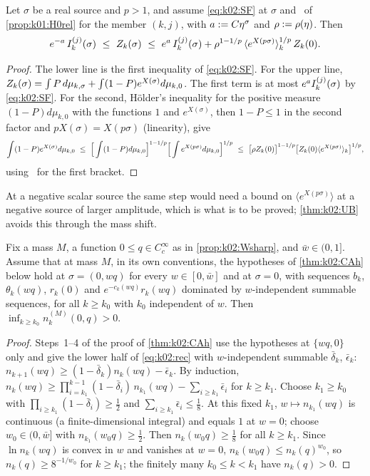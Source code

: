 \begin{lemma}\label{lem:k02:HLF}
Let $\sigma$ be a real source and $p>1$, and assume \eqref{eq:k02:SF} at $\sigma$ and \Rzero\ of \cref{prop:k01:H0rel} for the member $(k,j)$, with $a:= C\eta^\sigma$ and $\rho:=\rho(\eta)$. Then
\[
e^{-a}\,\Ik{j}(\sigma)\ \le\ \Zk(\sigma)\ \le\ e^{a}\,\Ik{j}(\sigma)+\rho^{1-1/p}\,\langle e^{X(p\sigma)}\rangle_k^{1/p}\,\Zk(0).
\]
\end{lemma}
\begin{proof}
The lower line is the first inequality of \eqref{eq:k02:SF}. For the upper line, $Z_{k}(\sigma)=\int P\,d\mu_{k,\sigma}+\int(1-P)e^{X(\sigma)}d\mu_{k,0}$. The first term is at most $e^{a}I^{(j)}_{k}(\sigma)$ by \eqref{eq:k02:SF}. For the second, Hölder's inequality for the positive measure $(1-P)d\mu_{k,0}$ with the functions $1$ and $e^{X(\sigma)}$, then $1-P\le1$ in the second factor and $pX(\sigma)=X(p\sigma)$ (linearity), give
\[
\int(1-P)e^{X(\sigma)}d\mu_{k,0}\ \le\ \Big[\int(1-P)d\mu_{k,0}\Big]^{1-1/p}\Big[\int e^{X(p\sigma)}d\mu_{k,0}\Big]^{1/p}\ \le\ \big[\rho\Zk(0)\big]^{1-1/p}\big[\Zk(0)\langle e^{X(p\sigma)}\rangle_k\big]^{1/p},
\]
using \Rzero\ for the first bracket.
\end{proof}
At a negative scalar source the same step would need a bound on $\langle e^{X(p\sigma)}\rangle$ at a negative source of larger amplitude, which is what is to be proved; \cref{thm:k02:UB} avoids this through the mass shift.

\begin{lemma}\label{lem:k02:POS}
Fix a mass $M$, a function $0\le q\in C^\infty_c$ as in \cref{prop:k02:Wsharp}, and $\bar w\in(0,1]$. Assume that at mass $M$, in its own conventions, the hypotheses of \cref{thm:k02:CAh} below hold at $\sigma=(0,wq)$ for every $w\in[0,\bar w]$ and at $\sigma=0$, with sequences $b_k$, $\theta_k(wq)$, $r_k(0)$ and $e^{-c_k(wq)}r_k(wq)$ dominated by $w$-independent summable sequences, for all $k\ge k_0$ with $k_0$ independent of $w$. Then $\inf_{k\ge k_0}n^{(M)}_k(0,q)>0$.
\end{lemma}
\begin{proof}
Steps~1--4 of the proof of \cref{thm:k02:CAh} use the hypotheses at $\{wq,0\}$ only and give the lower half of \eqref{eq:k02:rec} with $w$-independent summable $\bar\delta_k$, $\bar\epsilon_k$: $n_{k+1}(wq)\ge(1-\bar\delta_k)n_k(wq)-\bar\epsilon_k$. By induction, $n_k(wq)\ge\prod_{i=k_1}^{k-1}(1-\bar\delta_i)\,n_{k_1}(wq)-\sum_{i\ge k_1}\bar\epsilon_i$ for $k\ge k_1$. Choose $k_1\ge k_0$ with $\prod_{i\ge k_1}(1-\bar\delta_i)\ge\frac12$ and $\sum_{i\ge k_1}\bar\epsilon_i\le\frac18$. At this fixed $k_1$, $w\mapsto n_{k_1}(wq)$ is continuous (a finite-dimensional integral) and equals $1$ at $w=0$; choose $w_0\in(0,\bar w]$ with $n_{k_1}(w_0q)\ge\frac12$. Then $n_k(w_0q)\ge\frac18$ for all $k\ge k_1$. Since $\ln n_k(wq)$ is convex in $w$ and vanishes at $w=0$, $n_k(w_0q)\le n_k(q)^{w_0}$, so $n_k(q)\ge8^{-1/w_0}$ for $k\ge k_1$; the finitely many $k_0\le k<k_1$ have $n_k(q)>0$.
\end{proof}
